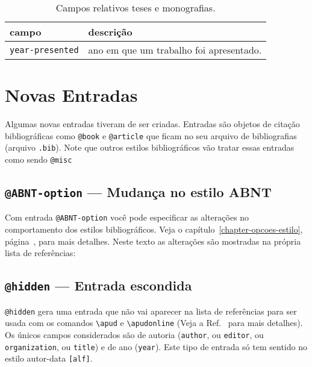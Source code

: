 \documentclass[espacosimples]{abnt}
\begin{document}
\begin{table}[htbp]
\begin{center}
\begin{tabular}{lp{8cm}}\hline\hline
campo & descrição \\ \hline
{\tt year-presented} & ano em que um trabalho foi apresentado.
\\ \hline\hline
\end{tabular}
\end{center}
\caption{Campos relativos teses e monografias.}
\label{tabela-campos-teses}
\end{table}


\chapter{Novas Entradas}

Algumas novas entradas tiveram de ser criadas. Entradas são
objetos de citação bibliográficas como \verb+@book+ e \verb+@article+
que ficam no seu arquivo de bibliografias (arquivo {\tt .bib}).
Note que outros estilos bibliográficos vão tratar essas entradas como
sendo \verb+@misc+

\section{{\tt @ABNT-option} --- Mudança no estilo ABNT}

Com entrada {\tt @ABNT-option} você pode especificar as alterações
no comportamento dos estilos bibliográficos.
Veja o capítulo~\ref{chapter-opcoes-estilo},
página~\pageref{chapter-opcoes-estilo}, para mais detalhes.
Neste texto as alterações são mostradas na própria lista de referências:

\section{{\tt @hidden} --- Entrada escondida }

{\tt @hidden} gera uma entrada que não vai aparecer na lista de
referências para ser usada com os comandos
\verb+\apud+ e \verb+\apudonline+ (Veja a Ref.~ para
mais detalhes).
Os únicos campos considerados são de autoria ({\tt author}, ou {\tt editor},
ou {\tt organization}, ou {\tt title}) e de ano
({\tt year}). 
Este tipo de entrada só tem sentido no estilo autor-data {\tt [alf]}.
\end{document}
